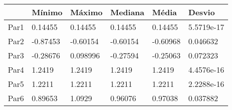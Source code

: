 \begin{tabular}{llllll}
& Mínimo & Máximo & Mediana & Média & Desvio \\ 
\hline 
Par1 & 0.14455 & 0.14455 & 0.14455 & 0.14455 & 5.5719e-17 \\ 
Par2 & -0.87453 & -0.60154 & -0.60154 & -0.60968 & 0.046632 \\ 
Par3 & -0.28676 & 0.098996 & -0.27594 & -0.25063 & 0.072323 \\ 
Par4 & 1.2419 & 1.2419 & 1.2419 & 1.2419 & 4.4576e-16 \\ 
Par5 & 1.2211 & 1.2211 & 1.2211 & 1.2211 & 2.2288e-16 \\ 
Par6 & 0.89653 & 1.0929 & 0.96076 & 0.97038 & 0.037882 \\ 
\hline 
\end{tabular}